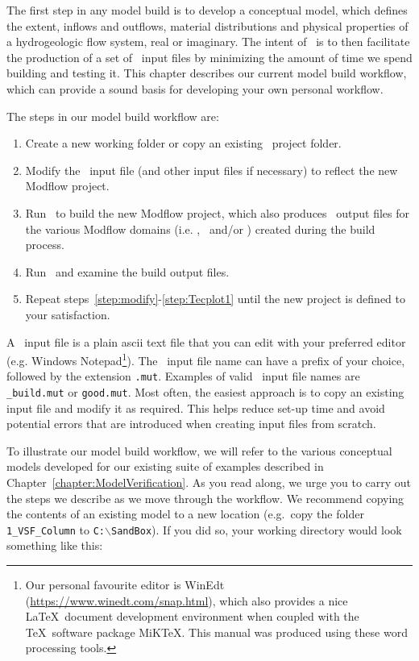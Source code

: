 \label{chapter:ModelBuild}
The first step in any model build is to develop a conceptual model, which defines the extent, inflows and outflows, material distributions and physical properties of a hydrogeologic flow system, real or imaginary. The intent of \mut\ is to then facilitate the production of a set of \mfus\ input files by minimizing the amount of time we spend building and testing it.  This chapter describes our current model build workflow, which can provide a sound basis for developing your own personal workflow.

The steps in our model build workflow are:
\begin{enumerate}
    \item Create a new working folder or copy an existing \mut\ project folder. \label{step:copy}
    \item Modify the \mut\ input file (and other input files if necessary) to reflect the new Modflow project.\label{step:modify}
    \item Run \mut\ to build the new Modflow project, which also produces \tecplot\ output files for the various Modflow domains (i.e. \gwf, \swf\ and/or \cln ) created during the build process. \label{step:mut1}
    \item Run \tecplot\ and examine the build output files.   \label{step:Tecplot1}
    \item Repeat steps~\ref{step:modify}-\ref{step:Tecplot1} until the new project is defined to your satisfaction.
\end{enumerate}

A \mut\ input file is a plain ascii text file that you can edit with your preferred editor (e.g. Windows Notepad\footnote{Our personal favourite editor is WinEdt (\url{https://www.winedt.com/snap.html}), which also provides a nice \LaTeX\ document development environment when coupled with the \TeX\ software package MiKTeX.  This manual was produced using these word processing tools.}).
The \mut\ input file name can have a prefix of your choice, followed by the extension \texttt{.mut}. Examples of valid \mut\ input file names are \texttt{\_build.mut} or \texttt{good.mut}. Most often, the easiest approach is to copy an existing input file and modify it as required.  This helps reduce set-up time and avoid potential errors that are introduced when creating input files from scratch.

To illustrate our model build workflow, we will refer to the various conceptual models developed for our existing suite of examples described in  Chapter~\ref{chapter:ModelVerification}.  As you read along, we urge you to carry out the steps we describe as we move through the workflow.  We recommend copying the contents of an existing model to a new location (e.g.\ copy the folder \texttt{1\_VSF\_Column} to \texttt{C:$\backslash$SandBox}).
\pagebreak 
If you did so, your working directory would look something like this:

